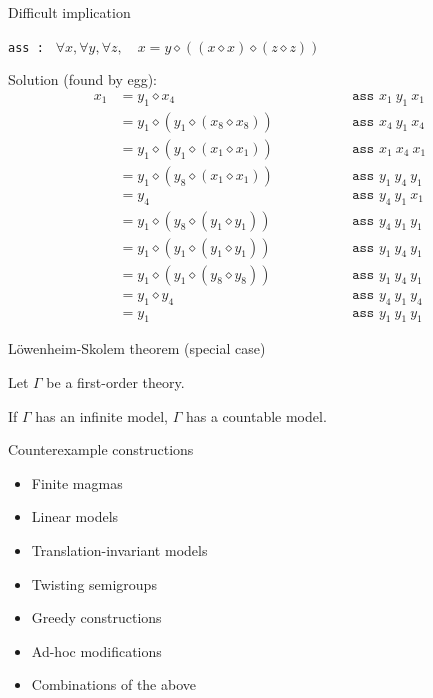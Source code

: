 \documentclass{beamer}
\newcommand{\op}{\diamond}
\begin{document}
\begin{frame}{Difficult implication}

\texttt{ass :   }
$ \forall x, \forall y,\forall z,\quad x = y \op ((x \op x) \op (z \op z)) $
\bigskip

Solution (found by egg):\vspace*{-1mm}
$$
\begin{aligned}
	x_1 & = y_1 \op x_4                 && \qquad \qquad \texttt{ass }x_1\ y_1\ x_1 \\
	& = y_1 \op (y_1 \op (x_8 \op x_8)) && \qquad \qquad \texttt{ass }x_4\ y_1\ x_4 \\
	& = y_1 \op (y_1 \op (x_1 \op x_1)) && \qquad \qquad \texttt{ass }x_1\ x_4\ x_1 \\
	& = y_1 \op (y_8 \op (x_1 \op x_1)) && \qquad \qquad \texttt{ass }y_1\ y_4\ y_1 \\
	& = y_4                             && \qquad \qquad \texttt{ass }y_4\ y_1\ x_1 \\
	& = y_1 \op (y_8 \op (y_1 \op y_1)) && \qquad \qquad \texttt{ass }y_4\ y_1\ y_1 \\
	& = y_1 \op (y_1 \op (y_1 \op y_1)) && \qquad \qquad \texttt{ass }y_1\ y_4\ y_1 \\
	& = y_1 \op (y_1 \op (y_8 \op y_8)) && \qquad \qquad \texttt{ass }y_1\ y_4\ y_1 \\
	& = y_1 \op y_4                     && \qquad \qquad \texttt{ass }y_4\ y_1\ y_4 \\
	& = y_1                             && \qquad \qquad \texttt{ass }y_1\ y_1\ y_1
\end{aligned}
$$

\end{frame}


\begin{frame}{Löwenheim-Skolem theorem (special case)}

Let $\Gamma$ be a first-order theory.

If $\Gamma$ has an infinite model, $\Gamma$ has a countable model.

\end{frame}


\begin{frame}{Counterexample constructions}

\begin{itemize}
	\item Finite magmas
	\item Linear models
	\item Translation-invariant models
	\item Twisting semigroups
	\item Greedy constructions
	\item Ad-hoc modifications
	\item Combinations of the above
\end{itemize}

\end{frame}
\end{document}
